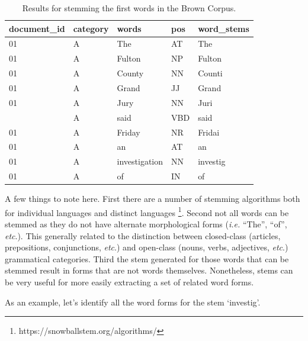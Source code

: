 \documentclass[
  letterpaper,
]{latex/krantz}
\begin{document}
\hypertarget{tbl-recoding-stemming-brown-example}{}
\begin{table}
\caption{\label{tbl-recoding-stemming-brown-example}Results for stemming the first words in the Brown Corpus. }\tabularnewline

\centering
\begin{tabular}{lllll}
\toprule
document\_id & category & words & pos & word\_stems\\
\midrule
01 & A & The & AT & The\\
01 & A & Fulton & NP & Fulton\\
01 & A & County & NN & Counti\\
01 & A & Grand & JJ & Grand\\
01 & A & Jury & NN & Juri\\
\addlinespace
01 & A & said & VBD & said\\
01 & A & Friday & NR & Fridai\\
01 & A & an & AT & an\\
01 & A & investigation & NN & investig\\
01 & A & of & IN & of\\
\bottomrule
\end{tabular}
\end{table}

A few things to note here. First there are a number of stemming
algorithms both for individual languages and distinct languages
\footnote{https://snowballstem.org/algorithms/}. Second not all words
can be stemmed as they do not have alternate morphological forms
(\emph{i.e.} ``The'', ``of'', \emph{etc}.). This generally related to
the distinction between closed-class (articles, prepositions,
conjunctions, \emph{etc}.) and open-class (nouns, verbs, adjectives,
\emph{etc}.) grammatical categories. Third the stem generated for those
words that can be stemmed result in forms that are not words themselves.
Nonetheless, stems can be very useful for more easily extracting a set
of related word forms.

As an example, let's identify all the word forms for the stem
`investig'.
\end{document}
